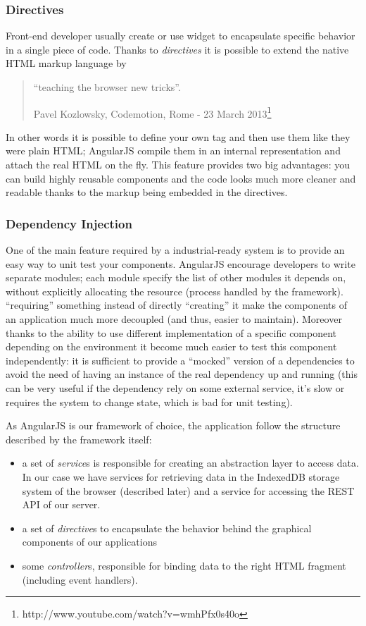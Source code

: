 \documentclass[a4paper,12pt]{report}
\begin{document}
\subsubsection{Directives}
Front-end developer usually create or use widget to encapsulate specific behavior in a single piece of code. Thanks to \emph{directives} it is possible to extend the native HTML markup language by \begin{quotation}
``teaching the browser new tricks''.
\begin{flushright}
Pavel Kozlowsky, Codemotion, Rome - 23 March 2013\footnote{http://www.youtube.com/watch?v=wmhPfx0s40o}
\end{flushright}
\end{quotation}
In other words it is possible to define your own tag and then use them like they were plain HTML; AngularJS compile them in an internal representation and attach the real HTML on the fly.
This feature provides two big advantages: you can build highly reusable components and the code looks much more cleaner and readable thanks to the markup being embedded in the directives. 
\subsubsection{Dependency Injection}
One of the main feature required by a industrial-ready system is to provide an easy way to unit test your components. AngularJS encourage developers to write separate modules; each module specify the list of other modules it depends on, without explicitly allocating the resource (process handled by the framework). ``requiring'' something instead of directly ``creating'' it make the components of an application much more decoupled (and thus, easier to maintain). Moreover thanks to the ability to use different implementation of a specific component depending on the environment it become much easier to test this component independently: it is sufficient to provide a ``mocked'' version of a dependencies to avoid the need of having an instance of the real dependency up and running (this can be very useful if the dependency rely on some external service, it's slow or requires the system to change state, which is bad for unit testing).


As AngularJS is our framework of choice, the application follow the structure described by the framework itself:
\begin{itemize}
\item a set of \emph{service}s is responsible for creating an abstraction layer to access data. In our case we have services for retrieving data in the IndexedDB storage system of the browser (described later) and a service for accessing the REST API of our server.
\item a set of \emph{directive}s to encapsulate the behavior behind the graphical components of our applications 
\item some \emph{controller}s, responsible for binding data to the right HTML fragment (including event handlers).
\end{itemize}
\end{document}
